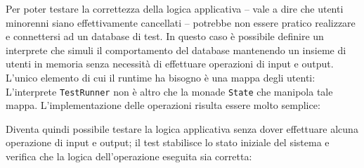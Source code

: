 Per poter testare la correttezza della logica applicativa -- vale a dire che utenti minorenni siano effettivamente cancellati -- potrebbe non essere pratico realizzare e connettersi ad un database di test. In questo caso è possibile definire un interprete che simuli il comportamento del database mantenendo un insieme di utenti in memoria senza necessità di effettuare operazioni di input e output. L'unico elemento di cui il runtime ha bisogno è una mappa degli utenti:
L'interprete \lstinline{TestRunner} non è altro che la monade \lstinline{State} che manipola tale mappa. L'implementazione delle operazioni risulta essere molto semplice:

Diventa quindi possibile testare la logica applicativa senza dover effettuare alcuna operazione di input e output; il test stabilisce lo stato iniziale del sistema e verifica che la logica dell'operazione eseguita sia corretta:










